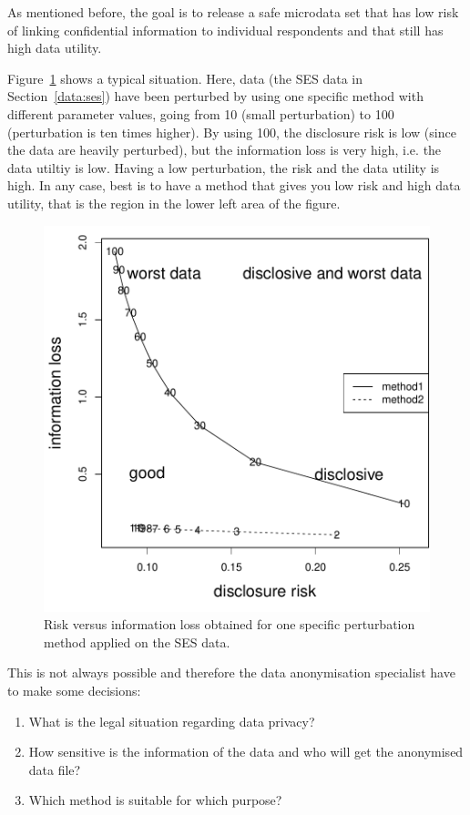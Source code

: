 \documentclass[12pt]{article}
\begin{document}
As mentioned before, the goal is to release a safe microdata set that has 
low risk of linking confidential information to individual respondents 
and that still has high data utility.

Figure~\ref{fig:rumap} shows a typical situation. Here, data (the SES data in Section~\ref{data:ses}) 
have been perturbed by using one specific method with different parameter values, going from 10 
(small perturbation) to 100 (perturbation is ten times higher). 
By using 100, the disclosure risk is low (since the data are heavily perturbed), but the information
loss is very high, i.e. the data utiltiy is low. Having a low perturbation, the risk and the 
data utility is high.
In any case, best is to have a method that gives you low risk and high data utility, that is the region in 
the lower left area of the figure. 


\begin{figure}[ht!]
\begin{center}
\includegraphics{guidelines-001}
\caption{\label{fig:rumap}Risk versus information loss obtained for one specific perturbation method applied on the
SES data.}
\end{center}
\end{figure}

This is not always possible and therefore the data anonymisation specialist have to make some 
decisions:
\begin{enumerate}
\item What is the legal situation regarding data privacy?
\item How sensitive is the information of the data and who will get the anonymised data file?
\item Which method is suitable for which purpose?
\end{enumerate}
\end{document}
